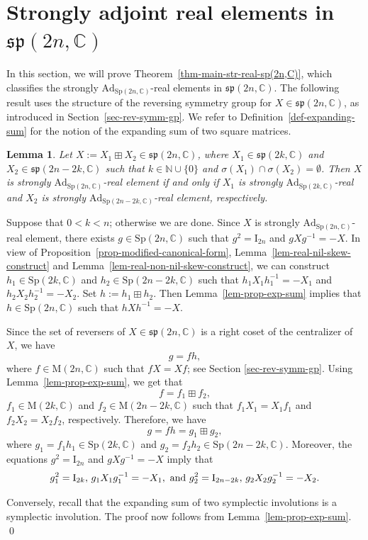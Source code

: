 \documentclass[11pt,reqno]{amsart}
\renewenvironment{proof}{{\bfseries Proof.}}{\qed}
\numberwithin{equation}{section}
\newtheorem{lemma}[theorem]{Lemma}
\theoremstyle{definition}
\def\C{\mathbb C}
\def\N{\mathbb N}
\def\C{\mathbb {C}}
\def\N{\mathbb {N}}
\newcommand{\defref}[1]{Definition~\ref{#1}}
\newcommand{\secref}[1]{Section~\ref{#1}}
\newcommand{\thmref}[1]{Theorem~\ref{#1}}
\newcommand{\lemref}[1]{Lemma~\ref{#1}}
\newcommand{\propref}[1]{Proposition~\ref{#1}}
\begin{document}
\section{Strongly  adjoint real elements in $\mathfrak{sp}(2n,\mathbb{C})$}
\label{sec-st-real}
In this section, we will prove  \thmref{thm-main-str-real-sp(2n,C)}, which classifies the strongly $\mathrm{Ad}_{\mathrm{Sp}(2n,\mathbb{C})}$-real elements in $\mathfrak{sp}(2n,\mathbb{C})$.  The following result uses the structure of the reversing symmetry group for $X \in \mathfrak{sp}(2n,\mathbb{C})$, as introduced in \secref{sec-rev-symm-gp}. We refer to \defref{def-expanding-sum} for the notion of the expanding sum of two square matrices.
\begin{lemma}\label{lem-factor-str-real}
Let $X := X_{1} \boxplus  X_{2} \in \mathfrak{sp}(2n,\mathbb{C})$, where $X_{1} \in \mathfrak{sp}(2k,\mathbb{C})$ and $X_{2} \in \mathfrak{sp}(2n-2k,\mathbb{C})$ such that $k \in \N \cup \{0\}$ and $\sigma( X_{1}) \cap \sigma( X_{2}) =  \emptyset$. Then $X$ is strongly $\mathrm{Ad}_{\mathrm{Sp}(2n,\mathbb{C})}$-real element if and only if  $X_{1}$  is strongly $\mathrm{Ad}_{\mathrm{Sp}(2k,\mathbb{C})}$-real and    $ X_{2}$  is  strongly $\mathrm{Ad}_{\mathrm{Sp}(2n-2k,\mathbb{C})}$-real element, respectively.
\end{lemma}
\begin{proof} Suppose that $0<k<n$; otherwise we are done.
Since	$X$ is strongly $\mathrm{Ad}_{\mathrm{Sp}(2n,\mathbb{C})}$-real element, there exists $g \in \mathrm{Sp}(2n, \C)$ such that 
	$g^2 = \mathrm{I}_{2n}$ and $gXg^{-1} =-X$. In view of \propref{prop-modified-canonical-form}, \lemref{lem-real-nil-skew-construct} and \lemref{lem-real-non-nil-skew-construct}, we can construct  $h_1 \in \mathrm{Sp}(2k, \C)$ and  $h_2 \in \mathrm{Sp}(2n-2k, \C)$  such that $h_1X_1h_1^{-1}=-X_1$ and $h_2X_2 h_2^{-1}=-X_2$. Set $h :=h_1 \boxplus h_2$.  Then \lemref{lem-prop-exp-sum} implies that $h \in \mathrm{Sp}(2n, \C)$ such that $hXh^{-1} =-X$.
	
	
Since the set of reversers of $X  \in \mathfrak{sp}(2n,\mathbb{C})$ is a right coset of the centralizer of $X$, we have
	$$g = fh,$$
	where	$f \in \mathrm{M}(2n, \C)$ such that $fX=Xf$; see Section \ref{sec-rev-symm-gp}.
	Using \lemref{lem-prop-exp-sum}, we get that 
	$$f =f_1 \boxplus f_2,$$
	$f_1 \in \mathrm{M}(2k, \C)$ and  $f_2 \in \mathrm{M}(2n-2k, \C)$  such that $f_1X_1=X_1f_1$ and $f_2X_2=X_2f_2$, respectively. Therefore, we have
	$$g = fh= g_1 \boxplus g_2,$$
	where $g_1 =f_1h_1 \in \mathrm{Sp}(2k, \C)$ and  $g_2 =f_2h_2 \in \mathrm{Sp}(2n-2k, \C)$. Moreover, the equations $g^2 = \mathrm{I}_{2n}$ and $gX g^{-1}=-X$  imply that
	$$g_{1}^{2} = \mathrm{I}_{2k}, \, g_1X_1 g_{1}^{-1}=-X_1, \hbox{ and } g_{2}^{2} = \mathrm{I}_{2n-2k}, \, g_2X_2 g_{2}^{-1}=-X_2.
	$$
	
Conversely, recall that the expanding sum of two symplectic involutions is a symplectic involution. The proof now follows from \lemref{lem-prop-exp-sum}.
\end{proof}
\end{document}
